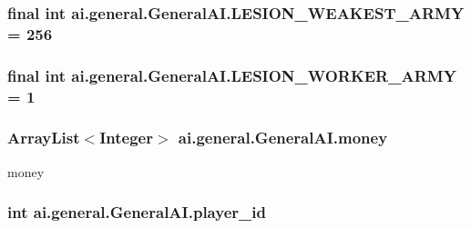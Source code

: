 \label{classai_1_1general_1_1_general_a_i_a29d5d7f18fa883d00fada4c526a7b659}
\hypertarget{classai_1_1general_1_1_general_a_i_ae09e26fba23a2726d8dfc4b160b48bfd}{
\subsubsection[{LESION\_\-WEAKEST\_\-ARMY}]{\setlength{\rightskip}{0pt plus 5cm}final int {\bf ai.general.GeneralAI.LESION\_\-WEAKEST\_\-ARMY} = 256}}
\label{classai_1_1general_1_1_general_a_i_ae09e26fba23a2726d8dfc4b160b48bfd}
\hypertarget{classai_1_1general_1_1_general_a_i_a12fc5ff8b96447bb4d44de4a8802085a}{
\subsubsection[{LESION\_\-WORKER\_\-ARMY}]{\setlength{\rightskip}{0pt plus 5cm}final int {\bf ai.general.GeneralAI.LESION\_\-WORKER\_\-ARMY} = 1}}
\label{classai_1_1general_1_1_general_a_i_a12fc5ff8b96447bb4d44de4a8802085a}
\hypertarget{classai_1_1general_1_1_general_a_i_a64d51272ee8ee14e4b190ed943684465}{
\subsubsection[{money}]{\setlength{\rightskip}{0pt plus 5cm}ArrayList$<$Integer$>$ {\bf ai.general.GeneralAI.money}}}
\label{classai_1_1general_1_1_general_a_i_a64d51272ee8ee14e4b190ed943684465}
money \hypertarget{classai_1_1general_1_1_general_a_i_a232c46c472f72f48ddc64152b6245ef1}{
\subsubsection[{player\_\-id}]{\setlength{\rightskip}{0pt plus 5cm}int {\bf ai.general.GeneralAI.player\_\-id}}}
